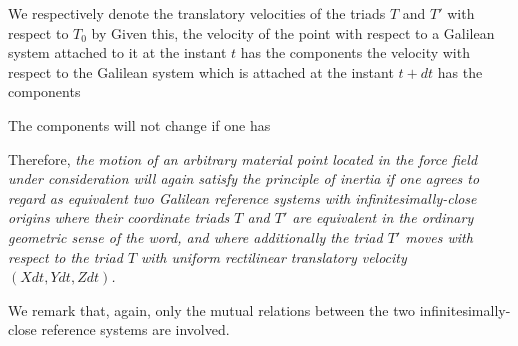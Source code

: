 We respectively denote the translatory velocities of the triads $T$ and $T'$ with respect to $T_0$ by
Given this, the velocity of the point with respect to a Galilean system attached to it at the instant $t$ has the components
the velocity with respect to the Galilean system which is attached at the instant $t+dt$ has the components

The components will not change if one has

Therefore, \textit{the motion of an arbitrary material point located in the force field under consideration will again satisfy the principle of inertia if one agrees to regard as equivalent two Galilean reference systems with infinitesimally-close origins}
\textit{where their coordinate triads $T$ and $T'$ are equivalent in the ordinary geometric sense of the word, and where additionally the triad $T'$ moves with respect to the triad $T$ with uniform rectilinear translatory velocity $(Xdt, Ydt, Zdt)$.}

We remark that, again, only the mutual relations between the two infinitesimally-close reference systems are involved.

%